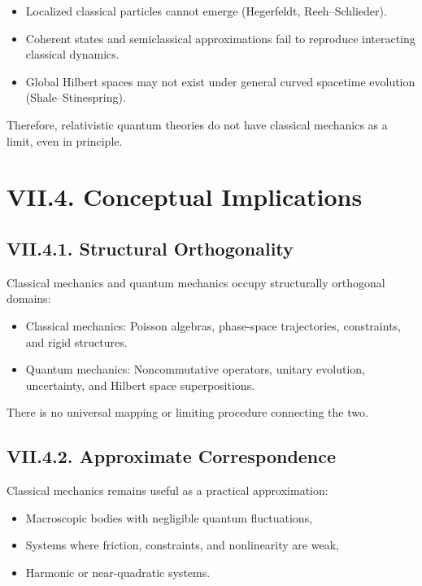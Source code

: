 \documentclass[12pt,oneside]{book}
\theoremstyle{plain}
\theoremstyle{definition}
\begin{document}
\begin{itemize}
    \item Localized classical particles cannot emerge (Hegerfeldt, Reeh–Schlieder).
    \item Coherent states and semiclassical approximations fail to reproduce interacting classical dynamics.
    \item Global Hilbert spaces may not exist under general curved spacetime evolution (Shale–Stinespring).
\end{itemize}

Therefore, relativistic quantum theories do not have classical mechanics as a limit, even in principle.

\section{VII.4. Conceptual Implications}

\subsection*{VII.4.1. Structural Orthogonality}

Classical mechanics and quantum mechanics occupy structurally orthogonal domains:

\begin{itemize}
    \item Classical mechanics: Poisson algebras, phase-space trajectories, constraints, and rigid structures.
    \item Quantum mechanics: Noncommutative operators, unitary evolution, uncertainty, and Hilbert space superpositions.
\end{itemize}

There is no universal mapping or limiting procedure connecting the two.

\subsection*{VII.4.2. Approximate Correspondence}

Classical mechanics remains useful as a practical approximation:

\begin{itemize}
    \item Macroscopic bodies with negligible quantum fluctuations,
    \item Systems where friction, constraints, and nonlinearity are weak,
    \item Harmonic or near-quadratic systems.
\end{itemize}
\end{document}
